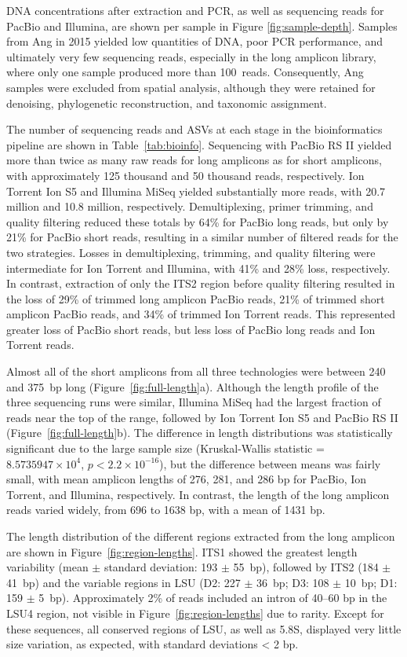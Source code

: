\documentclass[
  12pt,
]{article}
\begin{document}
DNA concentrations after extraction and PCR, as well as sequencing reads for PacBio and Illumina, are shown per sample in Figure \ref{fig:sample-depth}.
Samples from Ang in 2015 yielded low quantities of DNA, poor PCR performance, and ultimately very few sequencing reads, especially in the long amplicon library, where only one sample produced more than 100~reads.
Consequently, Ang samples were excluded from spatial analysis, although they were retained for denoising, phylogenetic reconstruction, and taxonomic assignment.

The number of sequencing reads and ASVs at each stage in the bioinformatics pipeline are shown in Table~\ref{tab:bioinfo}.
Sequencing with PacBio RS II yielded more than twice as many raw reads for long amplicons as for short amplicons, with approximately 125 thousand and 50 thousand reads, respectively.
Ion Torrent Ion S5 and Illumina MiSeq yielded substantially more reads, with 20.7 million and 10.8 million, respectively.
Demultiplexing, primer trimming, and quality filtering reduced these totals by 64\% for PacBio long reads, but only by 21\% for PacBio short reads, resulting in a similar number of filtered reads for the two strategies.
Losses in demultiplexing, trimming, and quality filtering were intermediate for Ion Torrent and Illumina, with 41\% and 28\% loss, respectively.
In contrast, extraction of only the ITS2 region before quality filtering resulted in the loss of 29\% of trimmed long amplicon PacBio reads, 21\% of trimmed short amplicon PacBio reads, and 34\% of trimmed Ion Torrent reads.
This represented greater loss of PacBio short reads, but less loss of PacBio long reads and Ion Torrent reads.

Almost all of the short amplicons from all three technologies were between 240 and 375~bp long (Figure~\ref{fig:full-length}a).
Although the length profile of the three sequencing runs were similar, Illumina MiSeq had the largest fraction of reads near the top of the range, followed by Ion Torrent Ion S5 and PacBio RS II (Figure~\ref{fig:full-length}b).
The difference in length distributions was statistically significant due to the large sample size (Kruskal-Wallis statistic = \ensuremath{8.5735947\times 10^{4}}, \(p < 2.2\times10^{-16}\)), but the difference between means was fairly small, with mean amplicon lengths of 276, 281, and 286 bp for PacBio, Ion Torrent, and Illumina, respectively.
In contrast, the length of the long amplicon reads varied widely, from 696 to 1638 bp, with a mean of 1431 bp.

The length distribution of the different regions extracted from the long amplicon are shown in Figure~\ref{fig:region-lengths}.
ITS1 showed the greatest length variability (mean \(\pm\) standard deviation: 193 \(\pm\) 55~bp), followed by ITS2 (184 \(\pm\) 41~bp) and the variable regions in LSU (D2: 227 \(\pm\) 36~bp; D3: 108 \(\pm\) 10~bp; D1: 159 \(\pm\) 5~bp).
Approximately 2\% of reads included an intron of 40--60 bp in the LSU4 region, not visible in Figure~\ref{fig:region-lengths} due to rarity.
Except for these sequences, all conserved regions of LSU, as well as 5.8S, displayed very little size variation, as expected, with standard deviations \textless{} 2 bp.
\end{document}

